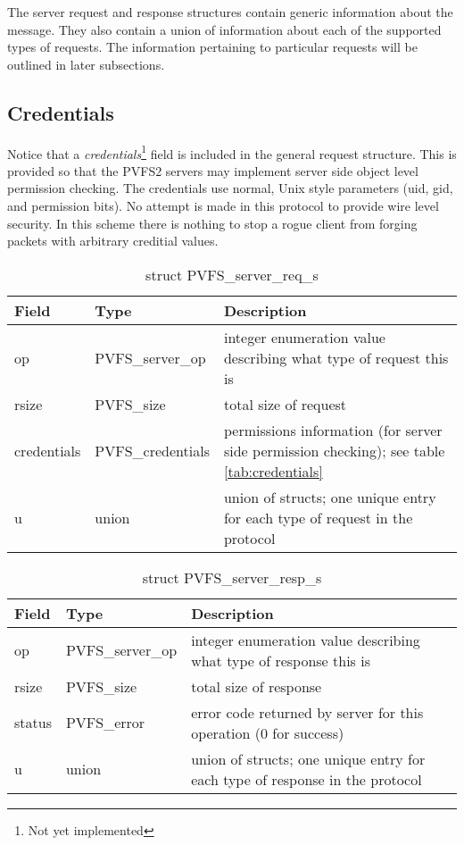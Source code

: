 \documentclass[11pt, letterpaper]{article} %
\begin{document}
The server request and response structures contain generic information
about the message.  They also contain a union of information about each
of the supported types of requests.  The information pertaining to
particular requests will be outlined in later subsections.

\subsection{Credentials}

Notice that a \emph{credentials}\footnote{Not yet implemented} field is included in the general
request structure.  This is provided so that the PVFS2 servers may
implement server side object level permission checking.  The
credentials use normal, Unix style parameters (uid, gid, and permission
bits).  No attempt is made in this protocol to provide wire level
security.  In this scheme there is nothing to stop a rogue client from
forging packets with arbitrary creditial values. 

\begin{table}[H]
\begin{tabular}{|l|l|l|}
\hline
Field & Type & Description \\
\hline
\hline
op & PVFS\_server\_op & integer enumeration value describing what type 
of request this is\\
\hline
rsize & PVFS\_size & total size of request\\
\hline 
credentials & PVFS\_credentials & permissions information (for server
side permission checking); see table \ref{tab:credentials}\\
\hline
u & union & union of structs; one unique entry for each type of request in the protocol\\
\hline
\end{tabular}
\caption{struct PVFS\_server\_req\_s \label{tab:req_s}}
\end{table}


\begin{table}[H]
\begin{tabular}{|l|l|l|}
\hline
Field & Type & Description \\
\hline
\hline
op & PVFS\_server\_op & integer enumeration value describing what type 
of response this is\\
\hline
rsize & PVFS\_size & total size of response\\
\hline
status & PVFS\_error & error code returned by server for this operation
(0 for success)\\
\hline
u & union & union of structs; one unique entry for each type of response in the protocol\\
\hline
\end{tabular}
\caption{struct PVFS\_server\_resp\_s \label{tab:resp_s}}
\end{table}
\end{document}
